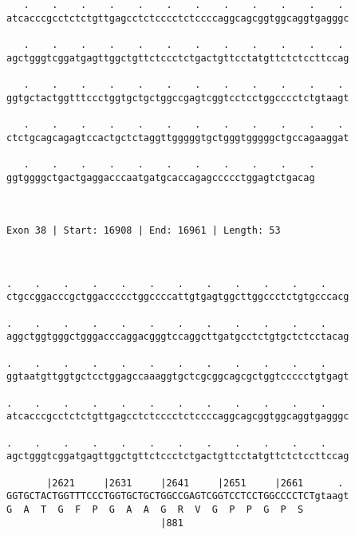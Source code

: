 \documentclass{article}
\begin{document}
\begin{Verbatim}
   .    .    .    .    .    .    .    .    .    .    .    . 
atcacccgcctctctgttgagcctctcccctctccccaggcagcggtggcaggtgagggc
                                                            
   .    .    .    .    .    .    .    .    .    .    .    . 
agctgggtcggatgagttggctgttctccctctgactgttcctatgttctctccttccag
                                                            
   .    .    .    .    .    .    .    .    .    .    .    . 
ggtgctactggtttccctggtgctgctggccgagtcggtcctcctggcccctctgtaagt
                                                            
   .    .    .    .    .    .    .    .    .    .    .    . 
ctctgcagcagagtccactgctctaggttgggggtgctgggtgggggctgccagaaggat
                                                            
   .    .    .    .    .    .    .    .    .    .    .
ggtggggctgactgaggacccaatgatgcaccagagccccctggagtctgacag
                                                      
                                                      
 
Exon 38 | Start: 16908 | End: 16961 | Length: 53



.    .    .    .    .    .    .    .    .    .    .    .    
ctgccggacccgctggaccccctggccccattgtgagtggcttggccctctgtgcccacg
                                                            
.    .    .    .    .    .    .    .    .    .    .    .    
aggctggtgggctgggacccaggacgggtccaggcttgatgcctctgtgctctcctacag
                                                            
.    .    .    .    .    .    .    .    .    .    .    .    
ggtaatgttggtgctcctggagccaaaggtgctcgcggcagcgctggtccccctgtgagt
                                                            
.    .    .    .    .    .    .    .    .    .    .    .    
atcacccgcctctctgttgagcctctcccctctccccaggcagcggtggcaggtgagggc
                                                            
.    .    .    .    .    .    .    .    .    .    .    .    
agctgggtcggatgagttggctgttctccctctgactgttcctatgttctctccttccag
                                                            
       |2621     |2631     |2641     |2651     |2661      . 
GGTGCTACTGGTTTCCCTGGTGCTGCTGGCCGAGTCGGTCCTCCTGGCCCCTCTgtaagt
G  A  T  G  F  P  G  A  A  G  R  V  G  P  P  G  P  S        
                           |881                             
  

\end{Verbatim}
\end{document}
